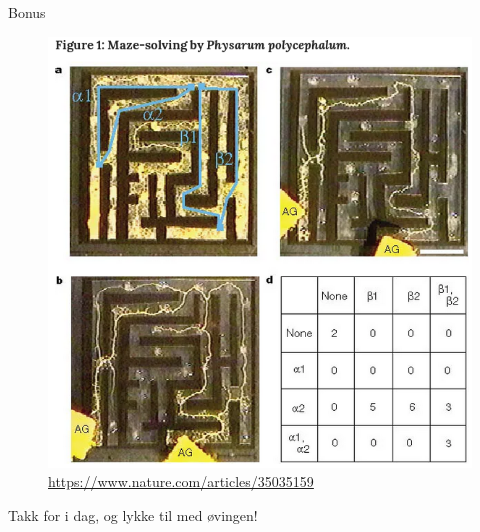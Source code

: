 \documentclass[14pt]{beamer}
\begin{document}
\begin{frame}[fragile]{Bonus}
    \centering
    \begin{figure}
        \includegraphics[height=0.75\textheight]{images/slimsopp_labyrint.png}
        \caption{\tiny \url{https://www.nature.com/articles/35035159}}
    \end{figure}
\end{frame}

\begin{frame}[standout]
    Takk for i dag, og lykke til med øvingen!
\end{frame}
\end{document}
